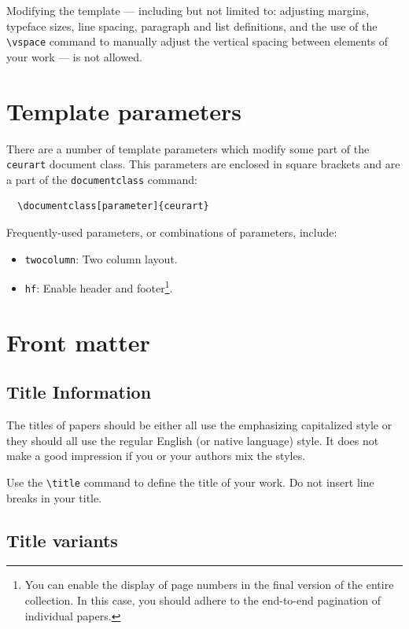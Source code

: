 \documentclass[
twocolumn,
]{ceurart}
\begin{document}
Modifying the template --- including but not limited to: adjusting
margins, typeface sizes, line spacing, paragraph and list definitions,
and the use of the \verb|\vspace| command to manually adjust the
vertical spacing between elements of your work --- is not allowed.

\section{Template parameters}

There are a number of template
parameters which modify some part of the \verb|ceurart| document class.
This parameters are enclosed in square
brackets and are a part of the {\verb|documentclass|} command:
\begin{verbatim}
  \documentclass[parameter]{ceurart}
\end{verbatim}

Frequently-used parameters, or combinations of parameters, include:
\begin{itemize}
\item {\verb|twocolumn|}: Two column layout.
\item {\verb|hf|}: Enable header and footer\footnote{You can enable
    the display of page numbers in the final version of the entire
    collection. In this case, you should adhere to the end-to-end
    pagination of individual papers.}.
\end{itemize}

\section{Front matter}

\subsection{Title Information}

The titles of papers should be either all use the emphasizing
capitalized style or they should all use the regular English (or
native language) style. It does not make a good impression if you or
your authors mix the styles.

Use the \verb|\title| command to define the title of your work. Do not
insert line breaks in your title.

\subsection{Title variants}
\end{document}

